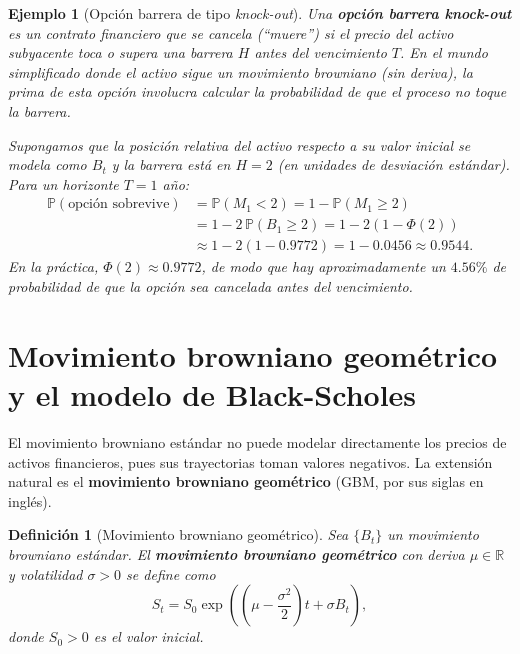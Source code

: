 \documentclass[12pt]{book}
\newtheorem{definition}{Definición}[chapter]
\newtheorem{example}{Ejemplo}[chapter]
\begin{document}
\begin{example}[Opción barrera de tipo \textit{knock-out}]
\label{ex:barrera}
Una \textbf{opción barrera knock-out} es un contrato financiero que se cancela (``muere'') si el precio del activo subyacente toca o supera una barrera $H$ antes del vencimiento $T$. En el mundo simplificado donde el activo sigue un movimiento browniano (sin deriva), la prima de esta opción involucra calcular la probabilidad de que el proceso no toque la barrera.

Supongamos que la posición relativa del activo respecto a su valor inicial se modela como $B_t$ y la barrera está en $H = 2$ (en unidades de desviación estándar). Para un horizonte $T = 1$ año:
\begin{align*}
    \mathbb{P}(\text{opción sobrevive}) &= \mathbb{P}(M_1 < 2) = 1 - \mathbb{P}(M_1 \ge 2) \\
    &= 1 - 2\,\mathbb{P}(B_1 \ge 2) = 1 - 2(1 - \Phi(2)) \\
    &\approx 1 - 2(1 - 0.9772) = 1 - 0.0456 \approx 0.9544.
\end{align*}
En la práctica, $\Phi(2) \approx 0.9772$, de modo que hay aproximadamente un $4.56\%$ de probabilidad de que la opción sea cancelada antes del vencimiento.
\end{example}

\section{Movimiento browniano geométrico y el modelo de Black-Scholes}

El movimiento browniano estándar no puede modelar directamente los precios de activos financieros, pues sus trayectorias toman valores negativos. La extensión natural es el \textbf{movimiento browniano geométrico} (GBM, por sus siglas en inglés).

\begin{definition}[Movimiento browniano geométrico]
\label{def:gbm}
Sea $\{B_t\}$ un movimiento browniano estándar. El \textbf{movimiento browniano geométrico} con deriva $\mu \in \mathbb{R}$ y volatilidad $\sigma > 0$ se define como
\[
    S_t = S_0 \exp\!\left(\left(\mu - \frac{\sigma^2}{2}\right)t + \sigma B_t\right),
\]
donde $S_0 > 0$ es el valor inicial.
\end{definition}
\end{document}
